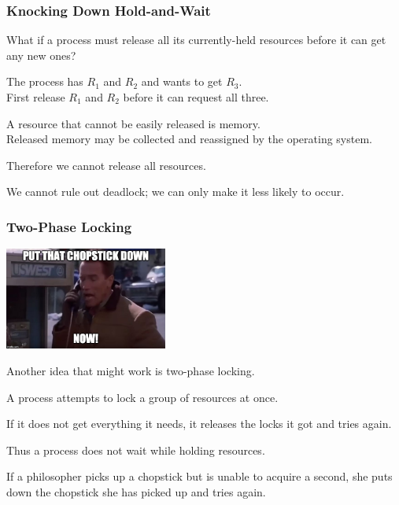 \begin{frame}
	\frametitle{Knocking Down Hold-and-Wait}

	What if a process must release all its currently-held resources before it can get any new ones?

	The process has $R_{1}$ and $R_{2}$ and wants to get $R_{3}$.\\
	\quad First release $R_{1}$ and $R_{2}$ before it can request all three.

	A resource that cannot be easily released is memory.\\
	\quad Released memory may be collected and reassigned by the operating system.

	Therefore we cannot release all resources.

	We cannot rule out deadlock; we can only make it less likely to occur.

\end{frame}

\begin{frame}
	\frametitle{Two-Phase Locking}
	
	\begin{center}
	\includegraphics[width=0.4\textwidth]{images/cookiedown.jpg}
	\end{center}

	Another idea that might work is \alert{two-phase locking}.

	A process attempts to lock a group of resources at once.

	If it does not get everything it needs, it releases the locks it got and tries again.

	Thus a process does not wait while holding resources.

	If a philosopher picks up a chopstick but is unable to acquire a second, she puts down the chopstick she has picked up and tries again.

\end{frame}

